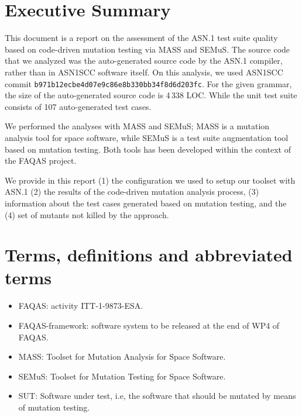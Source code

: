 
\chapter{Executive Summary}

This document is a report on the assessment of the ASN.1 test suite quality based on code-driven mutation testing via MASS and SEMuS. The source code that we analyzed was the auto-generated source code by the ASN.1 compiler, rather than in ASN1SCC software itself. On this analysis, we used ASN1SCC commit \texttt{b971b12ecbe4d07e9c86e8b330bb34f8d6d203fc}. For the given grammar, the size of the auto-generated source code is 4\,338 LOC. While the unit test suite consists of 107 auto-generated test cases.

We performed the analyses with MASS and SEMuS; MASS is a mutation analysis tool for space software, while SEMuS is a test suite augmentation tool based on mutation testing. Both tools has been developed within the context of the FAQAS project.

We provide in this report (1) the configuration we used to setup our toolset with ASN.1 (2) the results of the code-driven mutation analysis process, (3) information about the test cases generated based on mutation testing, and the (4) set of mutants not killed by the approach.




\chapter{Terms, definitions and abbreviated terms}

\begin{itemize}
\item{FAQAS}: activity ITT-1-9873-ESA.
\item{FAQAS-framework}: software system to be released at the end of WP4 of FAQAS.
\item{MASS}: Toolset for Mutation Analysis for Space Software.
\item{SEMuS}: Toolset for Mutation Testing for Space Software.
\item{SUT}: Software under test, i.e, the software that should be mutated by means of mutation testing.

\end{itemize}

\clearpage

